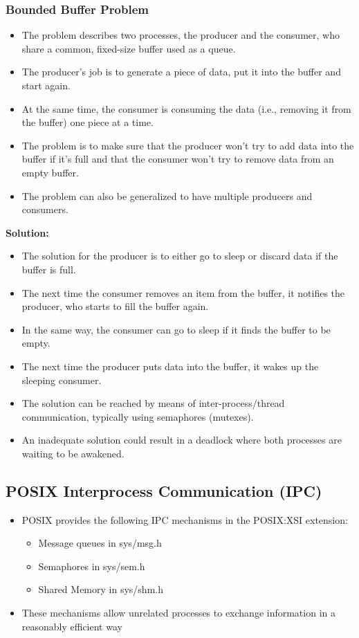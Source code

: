 \subsubsection{Bounded Buffer Problem}
\begin{itemize}[noitemsep,topsep=0pt]
  \item The problem describes two processes, the producer and the consumer, who share a common, fixed-size buffer used as a queue.
  \item The producer's job is to generate a piece of data, put it into the buffer and start again.
  \item At the same time, the consumer is consuming the data (i.e., removing it from the buffer) one piece at a time.
  \item The problem is to make sure that the producer won't try to add data into the buffer if it's full and that the consumer won't try to remove data from an empty buffer.
  \item The problem can also be generalized to have multiple producers and consumers.
\end{itemize}
\textbf{Solution:}
\begin{itemize}[noitemsep,topsep=0pt]
  \item The solution for the producer is to either go to sleep or discard data if the buffer is full.
  \item The next time the consumer removes an item from the buffer, it notifies the producer, who starts to fill the buffer again.
  \item In the same way, the consumer can go to sleep if it finds the buffer to be empty.
  \item The next time the producer puts data into the buffer, it wakes up the sleeping consumer.
  \item The solution can be reached by means of inter-process/thread communication, typically using semaphores (mutexes).
  \item An inadequate solution could result in a deadlock where both processes are waiting to be awakened.
\end{itemize}

\subsection{POSIX Interprocess Communication (IPC)}
\begin{itemize}[noitemsep,topsep=0pt]
  \item POSIX provides the following IPC mechanisms in the POSIX:XSI extension:
        \begin{itemize}
          \item Message queues in sys/msg.h
          \item Semaphores in sys/sem.h
          \item Shared Memory in sys/shm.h
        \end{itemize}
  \item These mechanisms allow unrelated processes to exchange information in a reasonably efficient way
\end{itemize}


